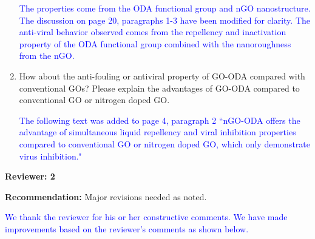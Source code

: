 \documentclass[12pt]{letter}
\newcommand{\blue}[1]{\textcolor{blue}{#1}} %
\begin{document}
\begin{enumerate}
\blue{ The properties come from the ODA functional group and nGO nanostructure. The discussion on page 20, paragraphs 1-3 have been modified for clarity. 
The anti-viral behavior observed 
comes from the repellency and inactivation property of the ODA functional group combined with the nanoroughness from the nGO.}


\item How about the anti-fouling or antiviral property of GO-ODA compared with conventional GOs? Please explain the advantages of GO-ODA compared to conventional GO or nitrogen doped GO.

\blue{The following text was added to page 4, paragraph 2 ``nGO-ODA offers the advantage of simultaneous liquid repellency and viral inhibition properties compared to conventional GO or nitrogen doped GO, which only demonstrate virus inhibition."}


\end{enumerate}

\newpage
\textbf{Reviewer: 2}

\textbf{Recommendation:} Major revisions needed as noted.

\blue{We thank the reviewer for his or her constructive comments. %
We have made improvements based on the reviewer's comments as shown below.}
\end{document}
